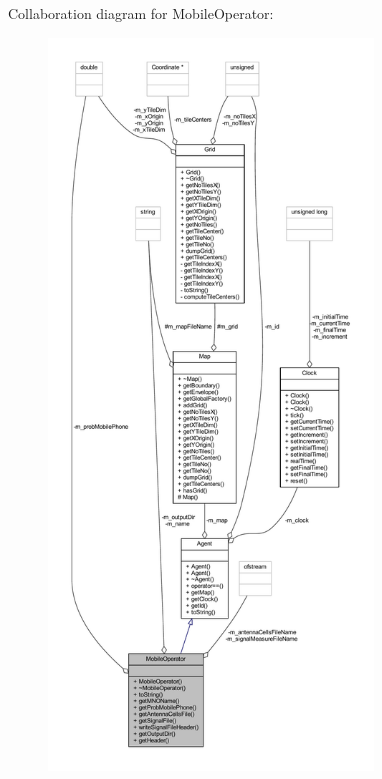 Collaboration diagram for Mobile\+Operator\+:
\nopagebreak
\begin{figure}[H]
\begin{center}
\leavevmode
\includegraphics[height=550pt]{class_mobile_operator__coll__graph}
\end{center}
\end{figure}
